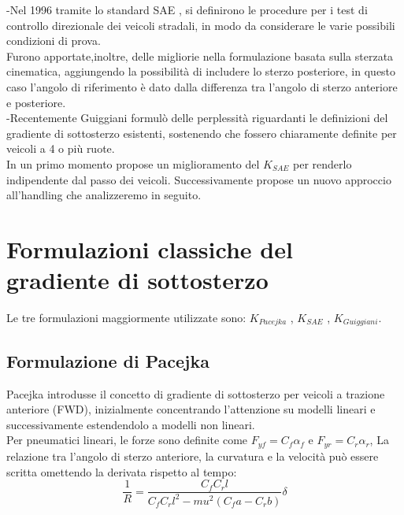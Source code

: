 -Nel 1996 tramite lo standard SAE \cite{J266_201811}, si definirono le procedure per i test di controllo direzionale dei veicoli stradali, in modo da considerare le varie possibili condizioni di prova. \\
Furono apportate,inoltre, delle migliorie nella formulazione basata sulla sterzata cinematica, aggiungendo la possibilità di includere lo sterzo posteriore, in questo caso l'angolo di riferimento è dato dalla differenza tra l'angolo di sterzo anteriore e posteriore.\\
-Recentemente Guiggiani formulò delle perplessità riguardanti le definizioni del gradiente di sottosterzo esistenti, sostenendo che fossero chiaramente definite per veicoli a 4 o più ruote.\\
In un primo momento propose un miglioramento del $K_{SAE}$ per renderlo indipendente dal passo dei veicoli.
Successivamente propose un nuovo approccio all'handling che analizzeremo in seguito.
\section{Formulazioni classiche del gradiente di sottosterzo}
Le tre formulazioni maggiormente utilizzate sono: $K_{Pacejka}$ , $K_{SAE}$ , $K_{Guiggiani}$.
\subsection{Formulazione di Pacejka}
Pacejka introdusse il concetto di gradiente di sottosterzo per veicoli a trazione anteriore (FWD), inizialmente concentrando l'attenzione su modelli lineari e successivamente estendendolo a modelli non lineari.\\
Per pneumatici lineari, le forze sono definite come $F_{yf} = C_f \alpha_f$ e $F_{yr} = C_r \alpha_r$, 
La relazione tra l'angolo di sterzo anteriore, la curvatura e la velocità può essere scritta omettendo la derivata rispetto
al tempo:\\
\begin{equation} \label{7}
\frac{1}{R} = \frac{ C_f C_r l}{C_f C_r l^2 - mu^2(C_f a - C_rb)} \delta
\end{equation}

